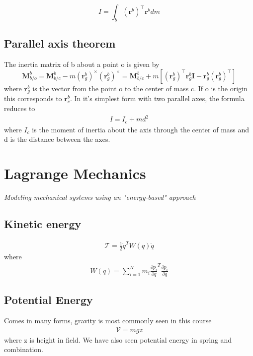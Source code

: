 \begin{equation}
    I = \int_{b} (\mathbf{r}^b)^\top \mathbf{r}^b dm
\end{equation}

\subsection{Parallel axis theorem}
The inertia matrix of b about a point o is given by 
\begin{equation}
    \mathbf{M}_{b/o}^b = \mathbf{M}_{b/c}^b - m (\mathbf{r}_g^b)^\times (\mathbf{r}_g^b)^\times =
    \mathbf{M}_{b/c}^b + m\left[ (\mathbf{r}_g^b)^\top \mathbf{r}_g^b \mathbf{I} - \mathbf{r}_g^b (\mathbf{r}_g^b)^\top \right]
\end{equation}
where $\mathbf{r}_g^b$ is the vector from the point o to the center of mass c. If o is the origin this corresponds to $\mathbf{r}_c^b$. In it's simplest form with two parallel axes, the formula reduces to 
\begin{align}
    I = I_c + md^2
\end{align}
where $I_c$ is the moment of inertia about the axis through the center of mass and d is the distance between the axes. 

\newpage
\section{Lagrange Mechanics}
\textit{Modeling mechanical systems using an "energy-based" approach}
\subsection{Kinetic energy}
\begin{align}
    \mathcal{T} = \frac{1}{2}\Dot{q}^TW(q)\Dot{q}
\end{align}
where
\begin{align}
    W(q) = \sum_{i=1}^Nm_i\frac{\partial p_i}{\partial q}^T\frac{\partial p_i}{\partial q}
\end{align}

\subsection{Potential Energy}
Comes in many forms, gravity is most commonly seen in this course
\begin{align}
    \mathcal{V} = mgz
\end{align}
where z is height in field. We have also seen potential energy in spring and combination.

